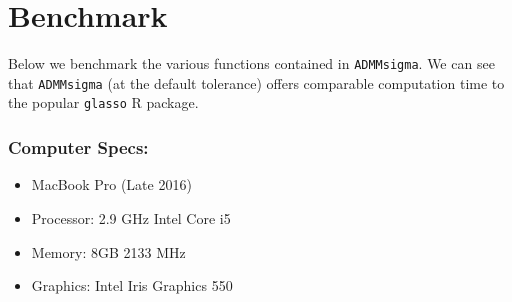 \documentclass[11pt,]{book}
\providecommand{\tightlist}{%
  \setlength{\itemsep}{0pt}\setlength{\parskip}{0pt}}
\theoremstyle{definition}
\theoremstyle{definition}
\theoremstyle{definition}
\theoremstyle{remark}
\begin{document}
\hypertarget{benchmark}{%
\chapter{Benchmark}\label{benchmark}}

Below we benchmark the various functions contained in
\texttt{ADMMsigma}. We can see that \texttt{ADMMsigma} (at the default
tolerance) offers comparable computation time to the popular
\texttt{glasso} R package.

\hypertarget{computer-specs}{%
\subsection{Computer Specs:}\label{computer-specs}}

\begin{itemize}
\tightlist
\item
  MacBook Pro (Late 2016)
\item
  Processor: 2.9 GHz Intel Core i5
\item
  Memory: 8GB 2133 MHz
\item
  Graphics: Intel Iris Graphics 550
\end{itemize}

\vspace{0.5cm}
\end{document}
